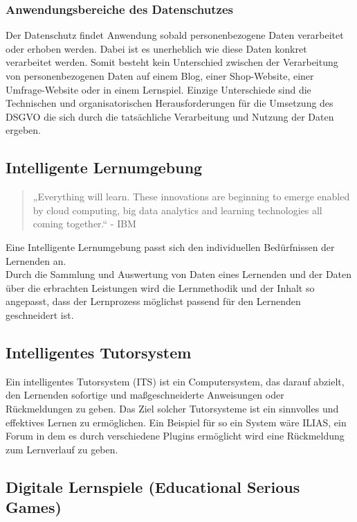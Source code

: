 \documentclass[a4paper, 12pt]{article}
\begin{document}
\subsubsection{Anwendungsbereiche des Datenschutzes}
Der Datenschutz findet Anwendung sobald personenbezogene Daten verarbeitet oder erhoben werden. Dabei ist es unerheblich wie diese Daten konkret verarbeitet werden. Somit besteht kein Unterschied zwischen der Verarbeitung von personenbezogenen Daten auf einem Blog, einer Shop-Website, einer Umfrage-Website oder in einem Lernspiel. Einzige Unterschiede sind die Technischen und organisatorischen Herausforderungen für die Umsetzung des DSGVO die sich durch die tatsächliche Verarbeitung und Nutzung der Daten ergeben.

\subsection{Intelligente Lernumgebung}
\begin{quote}
„Everything will learn. These innovations are beginning to emerge enabled by cloud computing, big data analytics and learning technologies all coming together.“ - IBM
\end{quote}

\noindent Eine Intelligente Lernumgebung passt sich den individuellen Bedürfnissen der Lernenden an. \\
Durch die Sammlung und Auswertung von Daten eines Lernenden und der Daten über die erbrachten Leistungen wird die Lernmethodik und der Inhalt so angepasst, dass der Lernprozess möglichst passend für den Lernenden geschneidert ist. 

\subsection{Intelligentes Tutorsystem}
Ein intelligentes Tutorsystem (ITS) ist ein Computersystem, das darauf abzielt, den Lernenden sofortige und maßgeschneiderte Anweisungen oder Rückmeldungen zu geben. Das Ziel solcher Tutorsysteme ist ein sinnvolles und effektives Lernen zu ermöglichen. Ein Beispiel für so ein System wäre ILIAS, ein Forum in dem es durch verschiedene Plugins ermöglicht wird eine Rückmeldung zum Lernverlauf zu geben.


\subsection{Digitale Lernspiele (Educational Serious Games)}
\end{document}
